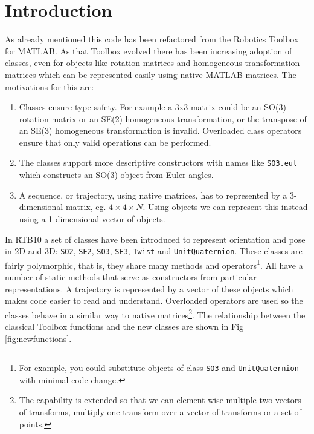 \documentclass[a4paper,twoside]{report}
\begin{document}

\cleardoublepage
\tableofcontents

\newpage
\chapter{Introduction}

As already mentioned this code has been refactored from the Robotics Toolbox for MATLAB.  As that Toolbox evolved there has been
increasing adoption of classes, even for objects like rotation matrices and homogeneous transformation matrices which can be
represented easily using native MATLAB matrices.  The motivations for this are:
\begin{enumerate}
\item Classes ensure type safety.  For example a 3x3 matrix could be an SO(3) rotation matrix or an SE(2) homogeneous transformation, or the transpose of an SE(3) homogeneous transformation is invalid.
Overloaded class operators ensure that only valid operations can be performed.
\item The classes support more descriptive constructors with names like \texttt{SO3.eul} which constructs an SO(3) object from Euler angles.
\item A sequence, or trajectory, using native matrices, has to represented by a 3-dimensional matrix, eg. $4\times 4 \times N$.  Using objects we can represent this instead using a 1-dimensional vector of objects.
\end{enumerate}
 
In RTB10 a set of classes have been introduced to represent orientation and pose in 2D and 3D: \texttt{SO2}, \texttt{SE2}, \texttt{SO3}, \texttt{SE3}, \texttt{Twist} and \texttt{UnitQuaternion}.  These classes are fairly polymorphic, that is, they share many methods and operators\footnote{For example, you could substitute objects of class \texttt{SO3} and \texttt{UnitQuaternion} with minimal code change.}.  All have a number of static methods that serve as constructors from particular representations.  A trajectory is represented by a vector of these objects which makes code easier to read and
understand.  Overloaded operators are used so the classes behave in a similar way to native matrices\footnote{The capability is extended so that we can element-wise multiple two vectors of transforms, multiply one transform over a vector of transforms or a set of points.}.
The relationship between the classical Toolbox functions and the new classes are shown in Fig \ref{fig:newfunctions}.
\end{document}
